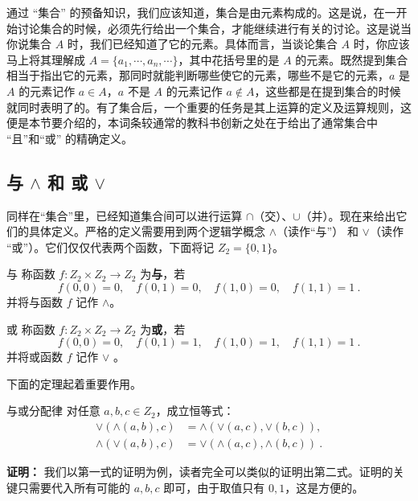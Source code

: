 
通过 “集合” 的预备知识，我们应该知道，集合是由元素构成的。这是说，在一开始讨论集合的时候，必须先行给出一个集合，才能继续进行有关的讨论。这是说当你说集合 $A$ 时，我们已经知道了它的元素。具体而言，当谈论集合 $A$ 时，你应该马上将其理解成 $A=\{a_1,\cdots,a_n,\cdots\}$，其中花括号里的是 $A$ 的元素。既然提到集合相当于指出它的元素，那同时就能判断哪些使它的元素，哪些不是它的元素，$a$ 是 $A$ 的元素记作 $a\in A$，$a$ 不是 $A$ 的元素记作 $a\notin A$，这些都是在提到集合的时候就同时表明了的。有了集合后，一个重要的任务是其上运算的定义及运算规则，这便是本节要介绍的，本词条较通常的教科书创新之处在于给出了通常集合中 “且”和“或” 的精确定义。
\subsection{与 $\land$ 和 或 $\lor$}
同样在“集合”里，已经知道集合间可以进行运算 $\cap$（交）、$\cup$（并）。现在来给出它们的具体定义。严格的定义需要用到两个逻辑学概念 $\land$（读作“与”） 和 $\lor$（读作 “或”）。它们仅仅代表两个函数，下面将记 $Z_2=\{0,1\}$。
\begin{definition}{与}\label{def_OpSet_2}
称函数 $f:Z_2\times Z_2\rightarrow Z_2$ 为\textbf{与}，若
\begin{equation}
f(0,0)=0,\quad f(0,1)=0,\quad f(1,0)=0,\quad f(1,1)=1~.
\end{equation}
并将与函数 $f$ 记作 $\land$。
\end{definition}
\begin{definition}{或}\label{def_OpSet_1}
称函数 $f:Z_2\times Z_2\rightarrow Z_2$ 为\textbf{或}，若
\begin{equation}
f(0,0)=0,\quad f(0,1)=1,\quad f(1,0)=1,\quad f(1,1)=1~.
\end{equation}
并将或函数 $f$ 记作 $\lor$ 。
\end{definition}
下面的定理起着重要作用。
\begin{theorem}{与或分配律}\label{the_OpSet_1}
对任意 $a,b,c\in Z_2$，成立恒等式：
\begin{equation}\label{eq_OpSet_1}
\begin{aligned}
\lor(\land(a,b),c)&=\land(\lor(a,c),\lor(b,c)),\\
\land(\lor(a,b),c)&=\lor(\land(a,c),\land(b,c))~.
\end{aligned}
\end{equation}
\end{theorem}
\textbf{证明：}
我们以第一式的证明为例，读者完全可以类似的证明出第二式。证明的关键只需要代入所有可能的 $a,b,c$ 即可，由于取值只有 $0,1$，这是方便的。

